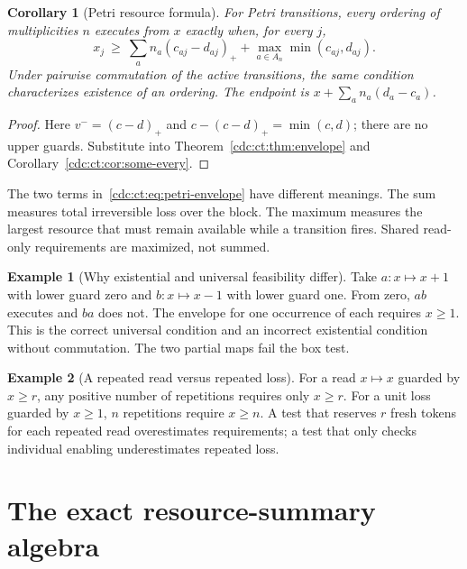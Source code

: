 \documentclass[11pt,a4paper]{article}
\newtheorem{corollary}[corollary]{Corollary}
\theoremstyle{definition}
\newtheorem{example}[example]{Example}
\theoremstyle{remark}
\newcommand{\srctag}[1]{\texorpdfstring{\hspace{0.5em}{\normalfont\small\color{accent}[#1]}}{ [#1]}}
\begin{document}
\begin{corollary}[Petri resource formula]\label{cdc:ct:cor:petri-envelope}
For Petri transitions, every ordering of multiplicities $n$ executes from $x$ exactly when, for every $j$,
\begin{equation}\label{cdc:ct:eq:petri-envelope}
 x_j\ \ge\ \sum_a n_a(c_{aj}-d_{aj})_+
           +\max_{a\in A_n}\min(c_{aj},d_{aj}).
\end{equation}
Under pairwise commutation of the active transitions, the same condition characterizes existence of an ordering. The endpoint is $x+\sum_a n_a(d_a-c_a)$.
\end{corollary}
\begin{proof}
Here $v^-=(c-d)_+$ and
$c-(c-d)_+=\min(c,d)$; there are no upper guards. Substitute into Theorem~\ref{cdc:ct:thm:envelope} and Corollary~\ref{cdc:ct:cor:some-every}.
\end{proof}
The two terms in~\eqref{cdc:ct:eq:petri-envelope} have different meanings. The sum measures total irreversible loss over the block. The maximum measures the largest resource that must remain available while a transition fires. Shared read-only requirements are maximized, not summed.

\begin{example}[Why existential and universal feasibility differ]
Take $a:x\mapsto x+1$ with lower guard zero and $b:x\mapsto x-1$ with lower guard one. From zero, $ab$ executes and $ba$ does not. The envelope for one occurrence of each requires $x\ge1$. This is the correct universal condition and an incorrect existential condition without commutation. The two partial maps fail the box test.
\end{example}
\begin{example}[A repeated read versus repeated loss]
For a read $x\mapsto x$ guarded by $x\ge r$, any positive number of repetitions requires only $x\ge r$. For a unit loss guarded by $x\ge1$, $n$ repetitions require $x\ge n$. A test that reserves $r$ fresh tokens for each repeated read overestimates requirements; a test that only checks individual enabling underestimates repeated loss.
\end{example}


\section{The exact resource-summary algebra\srctag{06}}
\label{cdc:cs:sec:resources}
\end{document}
